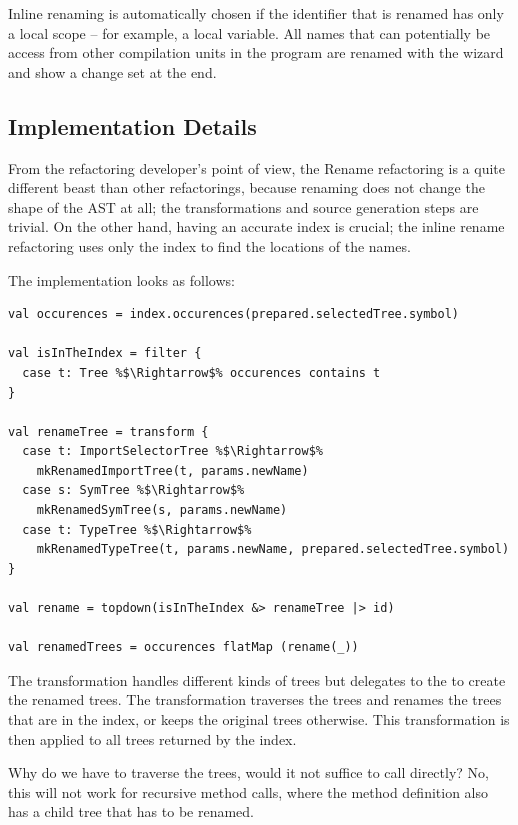 \documentclass[10pt,a4paper,oneside]{scrreprt}
\begin{document}
Inline renaming is automatically chosen if the identifier that is renamed has only a local scope -- for example, a local variable. All names that can potentially be access from other compilation units in the program are renamed with the wizard and show a change set at the end.

\subsection{Implementation Details}

From the refactoring developer's point of view, the Rename refactoring is a quite different beast than other refactorings, because renaming does not change the shape of the AST at all; the transformations and source generation steps are trivial. On the other hand, having an accurate index is crucial; the inline rename refactoring uses only the index to find the locations of the names.

The implementation looks as follows:

\begin{lstlisting}
val occurences = index.occurences(prepared.selectedTree.symbol) 
    
val isInTheIndex = filter {
  case t: Tree %$\Rightarrow$% occurences contains t 
}

val renameTree = transform {
  case t: ImportSelectorTree %$\Rightarrow$% 
    mkRenamedImportTree(t, params.newName)
  case s: SymTree %$\Rightarrow$% 
    mkRenamedSymTree(s, params.newName)
  case t: TypeTree %$\Rightarrow$% 
    mkRenamedTypeTree(t, params.newName, prepared.selectedTree.symbol)
}

val rename = topdown(isInTheIndex &> renameTree |> id)

val renamedTrees = occurences flatMap (rename(_))
\end{lstlisting}

The  transformation handles different kinds of trees but delegates to the  to create the renamed trees. The  transformation traverses the trees and renames the trees that are in the index, or keeps the original trees otherwise. This transformation is then applied to all trees returned by the index.

Why do we have to traverse the trees, would it not suffice to call  directly? No, this will not work for recursive method calls, where the method definition also has a child tree that has to be renamed.
\end{document}
